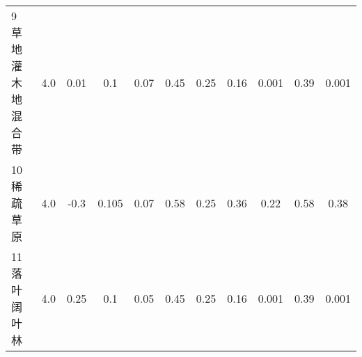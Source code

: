 \begin{landscape}
\begin{table}[htbp]
\begin{tabular}{@{}lcccccccccc@{}}
    9 草地灌木地混合带     & 4.0        & 0.01                                                                         & 0.1                                                                                                             & 0.07                                                                                                            & 0.45                                                                                                            & 0.25                                                                                                            & 0.16                                                                                                            & 0.001                                                                                                           & 0.39                                                                                                            & 0.001                                                                                                           \\
    10 稀疏草原        & 4.0        & -0.3                                                                         & 0.105                                                                                                           & 0.07                                                                                                            & 0.58                                                                                                            & 0.25                                                                                                            & 0.36                                                                                                            & 0.22                                                                                                            & 0.58                                                                                                            & 0.38                                                                                                            \\
    11 落叶阔叶林       & 4.0        & 0.25                                                                         & 0.1                                                                                                             & 0.05                                                                                                            & 0.45                                                                                                            & 0.25                                                                                                            & 0.16                                                                                                            & 0.001                                                                                                           & 0.39                                                                                                            & 0.001                                                                                                           \\

\end{tabular}
\end{table}
\end{landscape}
